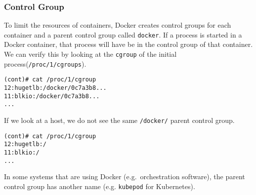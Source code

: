 \subsubsection{Control Group}\label{subsubsection:detection:cgroup}
To limit the resources of containers, Docker creates control groups for each container and a parent control group called \lstinline{docker}. If a process is started in a Docker container, that process will have be in the control group of that container. We can verify this by looking at the \lstinline{cgroup} of the initial process(\lstinline{/proc/1/cgroups})\cite{Metasploit-Linux-Gather-Container-Detection}.

\begin{lstlisting}[caption={Process control group inside container\protect\footnotemark.},captionpos=b]
(cont)# cat /proc/1/cgroup
12:hugetlb:/docker/0c7a3b8...
11:blkio:/docker/0c7a3b8...
...
\end{lstlisting}

If we look at a host, we do not see the same \lstinline{/docker/} parent control group.
\begin{lstlisting}[caption={Process control groups on host.},captionpos=b]
(cont)# cat /proc/1/cgroup
12:hugetlb:/
11:blkio:/
...
\end{lstlisting}

In some systems that are using Docker (e.g.\ orchestration software), the parent control group has another name (e.g. \lstinline{kubepod} for Kubernetes).
